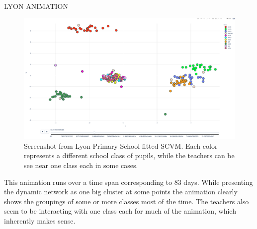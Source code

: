 LYON ANIMATION
\begin{figure}[H]
    \centering
    \includegraphics[width=\textwidth]{0_images/lyon_screenshot.png}
    \caption{Screenshot from Lyon Primary School fitted SCVM. Each color represents a different school class of pupils, while the teachers can be see near one class each in some cases.}
    \label{fig:LyonScreenshot}
\end{figure}
\noindent
This animation runs over a time span corresponding to 83 days. While presenting the dynamic network as one big cluster at some points the animation clearly shows the groupings of some or more classes most of the time.
The teachers also seem to be interacting with one class each for much of the animation, which inherently makes sense.